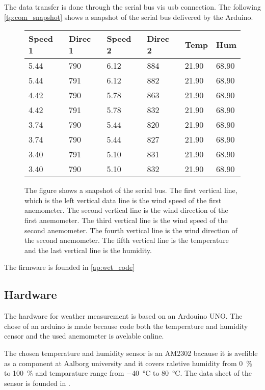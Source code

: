 The data transfer is done through the serial bus vis \gls{usb} connection. The following \autoref{tp:com_snapshot} shows a snapshot of the serial bus delivered by the Arduino.


\begin{figure}[H]
\centering
	  \captionsetup{width=0.57\linewidth}
	  \footnotesize
\begin{tabular}{llllll}
Speed 1 & Direc 1 & Speed 2 & Direc 2 & Temp  & Hum   \\ \hline
5.44    & 790     & 6.12    & 884     & 21.90 & 68.90 \\
5.44    & 791     & 6.12    & 882     & 21.90 & 68.90 \\
4.42    & 790     & 5.78    & 863     & 21.90 & 68.90 \\
4.42    & 791     & 5.78    & 832     & 21.90 & 68.90 \\
3.74    & 790     & 5.44    & 820     & 21.90 & 68.90 \\
3.74    & 790     & 5.44    & 827     & 21.90 & 68.90 \\
3.40    & 791     & 5.10    & 831     & 21.90 & 68.90 \\
3.40    & 790     & 5.10    & 832     & 21.90 & 68.90
\end{tabular}
\caption{The figure shows a snapshot of the serial bus. The first vertical line, which is the left vertical data line is the wind speed of the first anemometer.  The second vertical line is the wind direction of the first anemometer. The third vertical line is the wind speed of the second anemometer.  The fourth vertical line is the wind direction of the second anemometer. The fifth vertical line is the temperature and the last vertical line is the humidity.}
\label{tp:com_snapshot}
\end{figure}%


The firmware is founded in \autoref{ap:wet_code}


\subsection{Hardware}
The hardware for weather measurement is based on an Ardouino UNO. The chose of an arduino is made because code both the temperature and humidity censor and the used anemometer is avelable online. 

The chosen temperature and humidity sensor is an AM2302 bacause it is avelible as a component at Aalborg university and it covers raletive humidity from \SI{0}{\percent} to \SI{100}{\percent} and temparature range from \SI{-40}{\celsius} to \SI{80}{\celsius}. The data sheet of the sensor is founded in \citep{temp_sens}.


